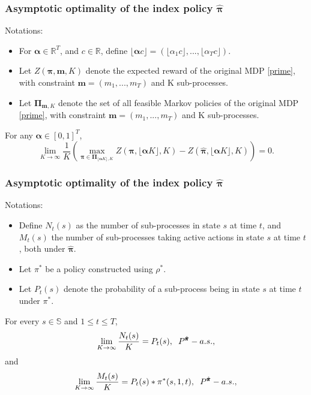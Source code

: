 \documentclass{beamer}
\newcommand{\mv}{\mathbf{m}}
\newcommand{\alphav}{\pmb{\alpha}}
\newcommand{\allp}{\pmb{\pi}}
\newcommand{\allpset}{\mathbf{\Pi}}
\newcommand{\subp}{\pi}
\newcommand{\substates}{\mathbb{S}}
\begin{document}
\begin{frame}
\frametitle{Asymptotic optimality of the index policy $\hat{\allp}$}
Notations:
\begin{itemize}
\item For $\alphav\in \mathbb{R}^T$, and $c\in \mathbb{R}$, define $\lfloor\alphav c\rfloor=(\lfloor\alpha_1 c\rfloor,...,\lfloor\alpha_Tc\rfloor)$.
\item Let $Z(\allp, \mv, K)$ denote the expected reward of the original MDP \eqref{prime}, with constraint $\mv=(m_1,...,m_T)$ and K sub-processes.
\item Let $\allpset_{\mv,K}$ denote the set of all feasible Markov policies of the original MDP \eqref{prime}, with constraint $\mv=(m_1,...,m_T)$ and K sub-processes.
\end{itemize}
\begin{theorem}[1]
For any $\alphav \in [0,1]^T$,
\begin{equation}
\lim_{K\rightarrow\infty}\frac{1}{K}\left(\max_{\allp\in\allpset_{\lfloor \alphav K\rfloor,K}}Z(\allp,\lfloor \alphav K\rfloor,K)-Z(\hat{\allp},\lfloor \alphav K\rfloor,K)\right) = 0.
\end{equation}
\end{theorem}
\end{frame}

\begin{frame}
\frametitle{Asymptotic optimality of the index policy $\hat{\allp}$}
Notations:
\begin{itemize}
\item Define $N_t(s)$ as the number of sub-processes in state $s$ at time $t$, and $M_t(s)$ the number of sub-processes taking active actions in state $s$ at time $t$, both under $\hat{\allp}$.
\item Let $\pi^{*}$ be a policy constructed using $\rho^*$.
\item Let $P_t(s)$ denote the probability of a sub-process being in state $s$ at time $t$ under $\pi^*$.
\end{itemize}
\begin{theorem}[2]\label{th:conv}
For every $s\in\substates$ and $1\leq t\leq T$,
\begin{equation}\label{conv1}
\lim_{K\rightarrow\infty}\frac{N_t(s)}{K} = P_t(s), \hspace{2mm} P^{\hat{\allp}}-a.s.,
\end{equation}
and
\begin{equation}\label{conv2}
\lim_{K\rightarrow\infty}\frac{M_t(s)}{K} = P_t(s)*\subp^*(s,1,t), \hspace{2mm} P^{\hat{\allp}}-a.s., 
\end{equation}
\end{theorem}
\end{frame}
\end{document}
